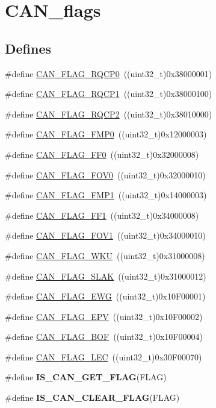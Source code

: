 \hypertarget{group__CAN__flags}{
\section{CAN\_\-flags}
\label{group__CAN__flags}
}
\subsection*{Defines}
\begin{DoxyCompactItemize}
\item 
\#define \hyperlink{group__CAN__flags_ga6df0579049eb471720ea103c5446298b}{CAN\_\-FLAG\_\-RQCP0}~((uint32\_\-t)0x38000001)
\item 
\#define \hyperlink{group__CAN__flags_gaba705586ebc3d961507436c03a2feaba}{CAN\_\-FLAG\_\-RQCP1}~((uint32\_\-t)0x38000100)
\item 
\#define \hyperlink{group__CAN__flags_ga9c20cd47e558135bd7ae71149583d487}{CAN\_\-FLAG\_\-RQCP2}~((uint32\_\-t)0x38010000)
\item 
\#define \hyperlink{group__CAN__flags_ga4b40574700edfe752433bb4e0d457c64}{CAN\_\-FLAG\_\-FMP0}~((uint32\_\-t)0x12000003)
\item 
\#define \hyperlink{group__CAN__flags_ga11648741ff43af1561ce7009698fb797}{CAN\_\-FLAG\_\-FF0}~((uint32\_\-t)0x32000008)
\item 
\#define \hyperlink{group__CAN__flags_ga2abd66b5e0032132673208decd2d01f2}{CAN\_\-FLAG\_\-FOV0}~((uint32\_\-t)0x32000010)
\item 
\#define \hyperlink{group__CAN__flags_ga5d4b7376954a059fbd74ed8d688f6657}{CAN\_\-FLAG\_\-FMP1}~((uint32\_\-t)0x14000003)
\item 
\#define \hyperlink{group__CAN__flags_ga0fa967743c5db04189bb2160aa48e371}{CAN\_\-FLAG\_\-FF1}~((uint32\_\-t)0x34000008)
\item 
\#define \hyperlink{group__CAN__flags_gac1af6e61b1285ddc4658c4bcc152719a}{CAN\_\-FLAG\_\-FOV1}~((uint32\_\-t)0x34000010)
\item 
\#define \hyperlink{group__CAN__flags_ga18c72dbe75cb80e8b5126c23c9120818}{CAN\_\-FLAG\_\-WKU}~((uint32\_\-t)0x31000008)
\item 
\#define \hyperlink{group__CAN__flags_gad087b5025a3d5ead2c32b06663821cf4}{CAN\_\-FLAG\_\-SLAK}~((uint32\_\-t)0x31000012)
\item 
\#define \hyperlink{group__CAN__flags_gae8906ba9c4031866c5096418ffa9bf71}{CAN\_\-FLAG\_\-EWG}~((uint32\_\-t)0x10F00001)
\item 
\#define \hyperlink{group__CAN__flags_ga61954e54995f638ed78281ad2b0cf43a}{CAN\_\-FLAG\_\-EPV}~((uint32\_\-t)0x10F00002)
\item 
\#define \hyperlink{group__CAN__flags_ga65f20612d0bf1692003882c0cdbadb1c}{CAN\_\-FLAG\_\-BOF}~((uint32\_\-t)0x10F00004)
\item 
\#define \hyperlink{group__CAN__flags_ga73a774fa4d391aec0ea6552bf9372917}{CAN\_\-FLAG\_\-LEC}~((uint32\_\-t)0x30F00070)
\item 
\#define {\bfseries IS\_\-CAN\_\-GET\_\-FLAG}(FLAG)
\item 
\#define {\bfseries IS\_\-CAN\_\-CLEAR\_\-FLAG}(FLAG)
\end{DoxyCompactItemize}


